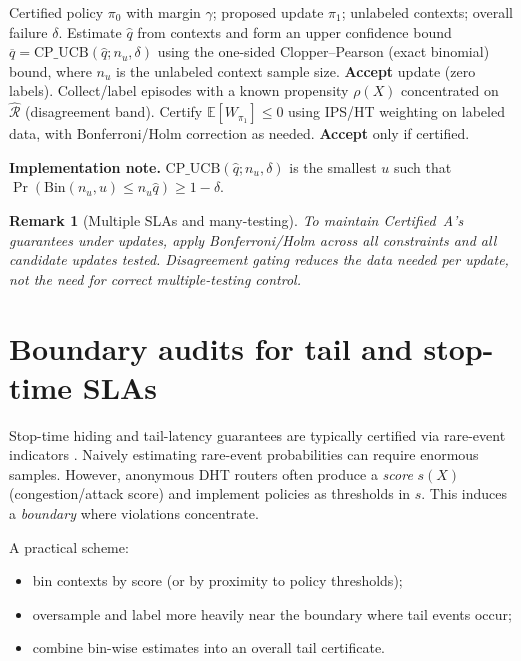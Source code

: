 \documentclass[11pt]{article}
\newtheorem{remark}{Remark}
\begin{document}
\begin{algorithm}[t]
\caption{Disagreement-gated recertification (single SLA)}
\label{alg:gate}
\begin{algorithmic}[1]
\Require Certified policy $\pi_0$ with margin $\gamma$; proposed update $\pi_1$; unlabeled contexts; overall failure $\delta$.
\State Estimate $\widehat{q}$ from contexts and form an upper confidence bound $\overline{q}=\mathrm{CP\_UCB}(\widehat{q};n_u,\delta)$ using the one-sided Clopper--Pearson (exact binomial) bound, where $n_u$ is the unlabeled context sample size.
  \State \Return \textbf{Accept} update (zero labels).
\Else
  \State Collect/label episodes with a known propensity $\rho(X)$ concentrated on $\widehat{\mathcal{R}}$ (disagreement band).
  \State Certify $\mathbb{E}[W_{\pi_1}]\le 0$ using IPS/HT weighting on labeled data, with Bonferroni/Holm correction as needed.
  \State \Return \textbf{Accept} only if certified.
\EndIf
\end{algorithmic}
\end{algorithm}

\noindent\textbf{Implementation note.} $\mathrm{CP\_UCB}(\widehat{q};n_u,\delta)$ is the smallest $u$ such that $\Pr(\mathrm{Bin}(n_u,u)\le n_u\widehat{q})\ge 1-\delta$.

\begin{remark}[Multiple SLAs and many-testing]
To maintain Certified~A's guarantees under updates, apply Bonferroni/Holm across all constraints and all candidate updates tested.
Disagreement gating reduces the \emph{data needed per update}, not the need for correct multiple-testing control.
\end{remark}

\section{Boundary audits for tail and stop-time SLAs}
Stop-time hiding and tail-latency guarantees are typically certified via rare-event indicators \cite{series:stoptime,series:scheduling}.
Naively estimating rare-event probabilities can require enormous samples.
However, anonymous DHT routers often produce a \emph{score} $s(X)$ (congestion/attack score) and implement policies as thresholds in $s$.
This induces a \emph{boundary} where violations concentrate.

A practical scheme:
\begin{itemize}
  \item bin contexts by score (or by proximity to policy thresholds);
  \item oversample and label more heavily near the boundary where tail events occur;
  \item combine bin-wise estimates into an overall tail certificate.
\end{itemize}
\end{document}
